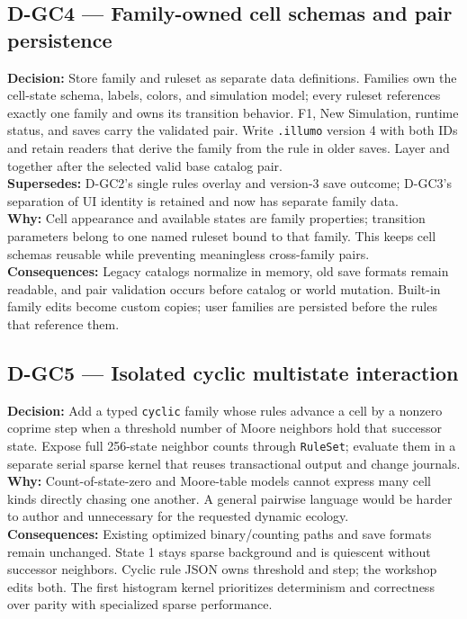 \subsection*{D-GC4 --- Family-owned cell schemas and pair persistence}
\begin{decisionbox}[title={D-GC4 \quad 2026-09-15}]
\textbf{Decision:} Store family and ruleset as separate data definitions.
Families own the cell-state schema, labels, colors, and simulation model;
every ruleset references exactly one family and owns its transition behavior.
F1, New Simulation, runtime status, and saves carry the validated pair.
Write \texttt{.illumo} version 4 with both IDs and retain readers that derive
the family from the rule in older saves. Layer
 and  together after
the selected valid base catalog pair.\\
\textbf{Supersedes:} D-GC2's single rules overlay and version-3 save outcome;
D-GC3's separation of UI identity is retained and now has separate family data.\\
\textbf{Why:} Cell appearance and available states are family properties;
transition parameters belong to one named ruleset bound to that family. This
keeps cell schemas reusable while preventing meaningless cross-family pairs.\\
\textbf{Consequences:} Legacy catalogs normalize in memory, old save formats
remain readable, and pair validation occurs before catalog or world mutation.
Built-in family edits become custom copies; user families are persisted before
the rules that reference them.
\end{decisionbox}

\subsection*{D-GC5 --- Isolated cyclic multistate interaction}
\begin{decisionbox}[title={D-GC5 \quad 2026-09-15}]
\textbf{Decision:} Add a typed \texttt{cyclic} family whose rules advance a
cell by a nonzero coprime step when a threshold number of Moore neighbors hold
that successor state. Expose full 256-state neighbor counts through
\texttt{RuleSet}; evaluate them in a separate serial sparse kernel that reuses
transactional output and change journals.\\
\textbf{Why:} Count-of-state-zero and Moore-table models cannot express many
cell kinds directly chasing one another. A general pairwise language would be
harder to author and unnecessary for the requested dynamic ecology.\\
\textbf{Consequences:} Existing optimized binary/counting paths and save
formats remain unchanged. State 1 stays sparse background and is quiescent
without successor neighbors. Cyclic rule JSON owns threshold and step; the
workshop edits both. The first histogram kernel prioritizes determinism and
correctness over parity with specialized sparse performance.
\end{decisionbox}

